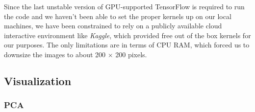 \documentclass{acm_proc_article-sp}
\begin{document}
Since the last unstable version of GPU-supported TensorFlow is required
to run the code and we haven't been able to set the proper kernels up on
our local machines, we have been constrained to rely on a publicly
available cloud interactive environment like \emph{Kaggle}, which
provided free out of the box kernels for our purposes. The only
limitations are in terms of CPU RAM, which forced us to downsize the
images to about 200 \(\times\) 200 pixels.

\hypertarget{visualization}{%
\subsection{Visualization}\label{visualization}}

\hypertarget{pca}{%
\subsubsection{PCA}\label{pca}}
\end{document}
